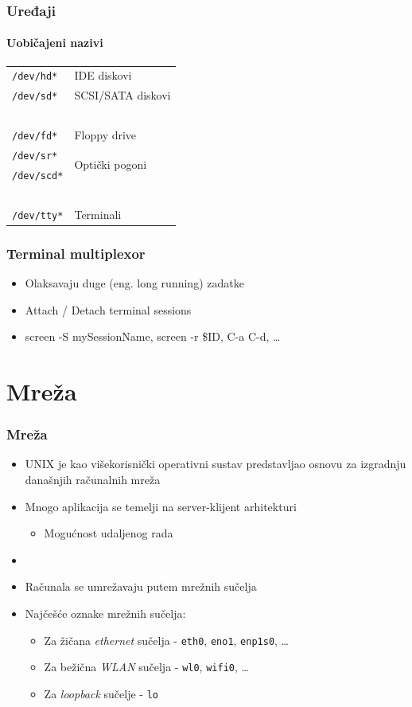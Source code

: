\documentclass[table,usenames,dvipsnames]{beamer}
\newcommand{\shell}[1]{\texttt{#1}}
\begin{document}
\begin{frame}[t]
	\frametitle{Uređaji}
	\framesubtitle{Uobičajeni nazivi}
	\begin{tabular}{l l}
		\shell{/dev/hd*} & IDE diskovi\\
		\shell{/dev/sd*} & SCSI/SATA diskovi\\
		\,\\
		\shell{/dev/fd*} & Floppy drive\\
		\shell{/dev/sr*} & \multirow{2}{*}{Optički pogoni}\\
		\shell{/dev/scd*} & \\
		\,\\
		\shell{/dev/tty*} & Terminali
	\end{tabular}
\end{frame}

\begin{frame}[t]
	\frametitle{Terminal multiplexor}
	\begin{itemize}
    \item Olaksavaju duge (eng. long running) zadatke
		\item Attach / Detach terminal sessions
		\item screen -S mySessionName, screen -r \$ID, C-a C-d, \ldots
	\end{itemize}
\end{frame}

\section{Mreža}
\begin{frame}[t]
	\frametitle{Mreža}
	\begin{itemize}
		\item UNIX je kao višekorisnički operativni sustav predstavljao osnovu za izgradnju današnjih računalnih mreža
		\item Mnogo aplikacija se temelji na server-klijent arhitekturi
		\begin{itemize}
			\item Mogućnost udaljenog rada
		\end{itemize}
		\item[]
		\item Računala se umrežavaju putem mrežnih sučelja
		\item Najčešće oznake mrežnih sučelja:
		\begin{itemize}
			\item Za žičana \emph{ethernet} sučelja - \shell{eth0}, \shell{eno1}, \shell{enp1s0}, \ldots
			\item Za bežična \emph{WLAN} sučelja - \shell{wl0}, \shell{wifi0}, \ldots
			\item Za \emph{loopback} sučelje - \shell{lo}
		\end{itemize}
	\end{itemize}
\end{frame}
\end{document}
